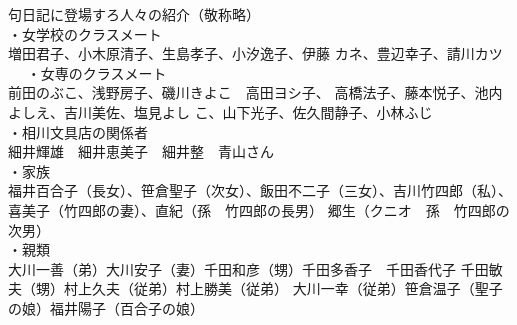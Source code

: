 {\gt 句日記に登場すろ人々の紹介（敬称略）}\\
・女学校のクラスメート\\
増田君子、小木原清子、生島孝子、小汐逸子、伊藤
カネ、豊辺幸子、請川カツ\\　
・女専のクラスメート\\
前田のぶこ、浅野房子、磯川きよこ　高田ヨシ子、
高橋法子、藤本悦子、池内よしえ、吉川美佐、塩見よし
こ、山下光子、佐久間静子、小林ふじ\\
・相川文具店の関係者\\
細井輝雄　細井恵美子　細井整　青山さん　\\
・家族\\
福井百合子（長女）、笹倉聖子（次女）、飯田不二子（三女）、吉川竹四郎（私）、
喜美子（竹四郎の妻）、直紀（孫　竹四郎の長男）
郷生（クニオ　孫　竹四郎の次男）\\
・親類\\
大川一善（弟）大川安子（妻）千田和彦（甥）千田多香子　千田香代子
千田敏夫（甥）村上久夫（従弟）村上勝美（従弟）
大川一幸（従弟）笹倉温子（聖子の娘）福井陽子（百合子の娘）

\endinput
\begin{yabular}{}
昭和四十八 1973 3 相川店\\
昭和四十九 1974 11 相具店\\
昭和五十 1975 15 相川店\\
昭和五十一 1976 16 相具店\\
昭和五十二 1977 17 相具店\\
昭和五十三 1978 17 相具店\\
昭和五十四 1979 26 相具店\\
昭和五十五 1980 29 相具店\\
昭和五十六 1981 78 相具店\\
昭和五十七 1982 40 水無瀬\\ %
昭和五十八 1983 37 水無瀬\\
昭和五十九 1984 45 水無瀬\\
昭和六十 1985 39 水無瀬\\
昭和六十一 1986 41 水無瀬\\
昭和六十二 1987 45 水無瀬\\
昭和六十三 1988 49 鵠沼\\
平成元年 1989 58 鵠沼\\
平成二年 1990 57 鵠沼\\
平成四年 1992 69 鵠沼\\
平成五年 1993 75 鵠沼\\
平成六年 1994 74 鵠沼\\
平成七年 1995 67 鵠沼\\
平成八年 1996 38 鵠沼\\
平成九年 1997 45 鵠沼 十月歿す \\
\hline
\end{tabular}

